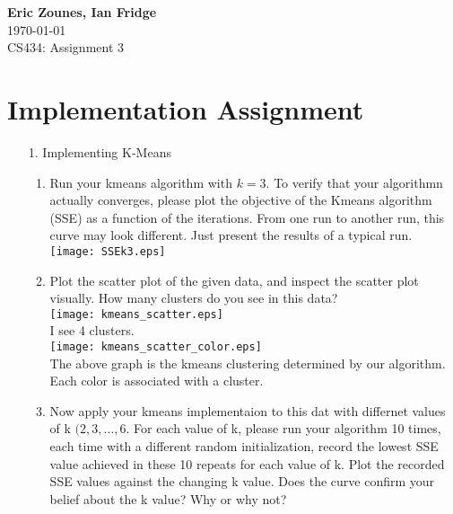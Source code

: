 \documentclass[12pt,letterpaper]{article}
\begin{document}
\setcounter{subsection}{2} 
\begin{flushright}
\end{flushright}
\begin{flushleft}
\textbf{Eric Zounes, Ian Fridge} \\
\today \\ 
CS434: Assignment 3
\end{flushleft}
\section[1]{Implementation Assignment} 
\begin{enumerate} 
	\item[1.] Implementing K-Means 	
	\begin{enumerate} 
		\item Run your kmeans algorithm with $k = 3$. To verify that your algorithmn actually converges, please plot the objective of the Kmeans algorithm (SSE) as a function of the iterations. From one run to another run, this curve may look different. Just present the results of a typical run. \\
		\texttt{[image: SSEk3.eps]} \\[15mm]
		\item Plot the scatter plot of the given data, and inspect the scatter plot visually. How many clusters do you see in this data? \\
		\texttt{[image: kmeans\_scatter.eps]} \\[15mm]
		
		I see 4 clusters. \\[10mm]
		\texttt{[image: kmeans\_scatter\_color.eps]} \\[15mm]
		The above graph is the kmeans clustering determined by our algorithm. Each color is associated with a cluster. \\
		\item Now apply your kmeans implementaion to this dat with differnet values of k $(2,3, \ldots, 6$. For each value of k, please run your algorithm 10 times, each time with a different random initialization, record the lowest SSE value achieved in these 10 repeats for each value of k. Plot the recorded SSE values against the changing k value. Does the curve confirm your belief about the k value? Why or why not? \\
		
	\end{enumerate} 
\end{enumerate} 
\end{document}
